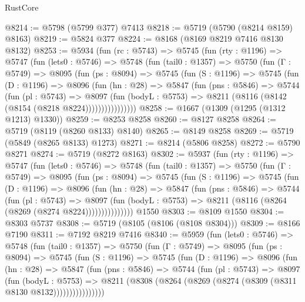 \begin{lexlean}{RustCore}
\begin{coremodule}
@8214 := @5798 (@5799 @377) @7413
@8218 := @5719 (@5790 (@8214 @8159) @8163)
@8219 := @5824 @377
@8224 := @8168 (@8169 @8219 @7416 @8130 @8132)
@8253 := @5934
    (fun (rc : @5743) =>
    @5745
      (fun (rty : @1196) =>
      @5747
        (fun (lets0 : @5746) =>
        @5748
          (fun (tail0 : @1357) =>
          @5750
            (fun (Γ : @5749) =>
            @8095
              (fun (ps : @8094) =>
              @5745
                (fun (S : @1196) =>
                @5745
                  (fun (D : @1196) =>
                  @8096
                    (fun (hn : @28) =>
                    @5847
                      (fun (pns : @5846) =>
                      @5744
                        (fun (pl : @5743) =>
                        @8097
                          (fun (bodyL : @5753) =>
                          @8211 (@8116 (@8142 (@8154 (@8218 @8224))))))))))))))))
@8258 := @1667 (@1309 (@1295 (@1312 @1213) @1330))
@8259 := @8253 @8258
@8260 := @8127 @8258
@8264 := @5719 (@8119 (@8260 @8133) @8140)
@8265 := @8149 @8258
@8269 := @5719 (@5849 (@8265 @8133) @1273)
@8271 := @8214 (@5806 @8258)
@8272 := @5790 @8271
@8274 := @5719 (@8272 @8163)
@8302 := @5937
    (fun (rty : @1196) =>
    @5747
      (fun (lets0 : @5746) =>
      @5748
        (fun (tail0 : @1357) =>
        @5750
          (fun (Γ : @5749) =>
          @8095
            (fun (ps : @8094) =>
            @5745
              (fun (S : @1196) =>
              @5745
                (fun (D : @1196) =>
                @8096
                  (fun (hn : @28) =>
                  @5847
                    (fun (pns : @5846) =>
                    @5744
                      (fun (pl : @5743) =>
                      @8097
                        (fun (bodyL : @5753) =>
                        @8211 (@8116 (@8264 (@8269 (@8274 @8224)))))))))))))))
    @1550
@8303 := @8109 @1550
@8304 := @8303 @5737
@8308 := @5719 (@8105 (@8106 (@8108 @8304)))
@8309 := @8166 @7190
@8311 := @7192 @8219 @7416
@8340 := @5959
    (fun (lets0 : @5746) =>
    @5748
      (fun (tail0 : @1357) =>
      @5750
        (fun (Γ : @5749) =>
        @8095
          (fun (ps : @8094) =>
          @5745
            (fun (S : @1196) =>
            @5745
              (fun (D : @1196) =>
              @8096
                (fun (hn : @28) =>
                @5847
                  (fun (pns : @5846) =>
                  @5744
                    (fun (pl : @5743) =>
                    @8097
                      (fun (bodyL : @5753) =>
                      @8211 (@8308 (@8264 (@8269 (@8274 (@8309 (@8311 @8130 @8132))))))))))))))))

\end{coremodule}
\end{lexlean}
